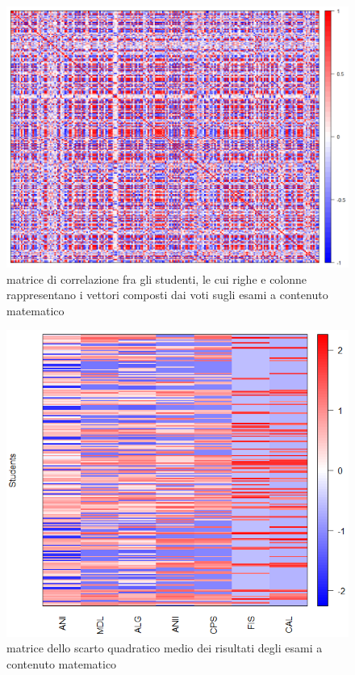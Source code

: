                 \begin{figure}
                    \centering
                    \caption{matrice di correlazione fra gli studenti, le cui righe e colonne rappresentano i vettori composti dai voti sugli esami a contenuto matematico}
                    \label{esami_mat_corr}
                	\includegraphics[scale=0.32]{img/corr_matrix_3.png}
                \end{figure}

                \begin{figure}
                    \centering
                    \caption{matrice dello scarto quadratico medio dei risultati degli esami a contenuto matematico}
                    \label{esami_mat_stddev}
                	\includegraphics[scale=0.6]{img/std_dev_matrix_3.png}
                \end{figure}

